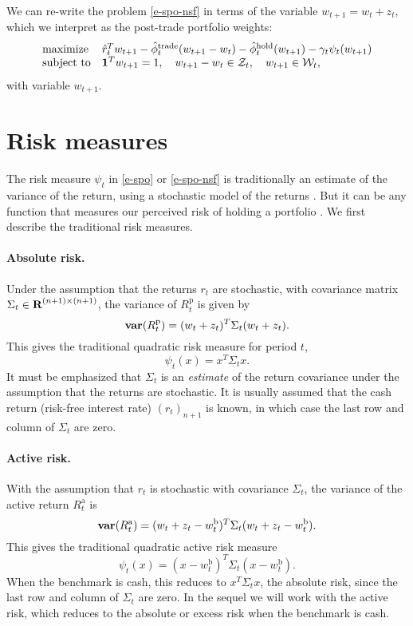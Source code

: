 \documentclass[openany]{article}  %
\newcommand{\trcosthat}{\hat \phi^\mathrm{trade}}
\newcommand{\hldcosthat}{\hat \phi^\mathrm{hold}}
\newcommand{\Rp}{R^\mathrm{p}}
\newcommand{\Rap}{R^\mathrm{a}}
\newcommand{\wb}{w^\mathrm{b}}
\begin{document}
We can re-write the problem \eqref{e-spo-nsf} in terms of
the variable $w_{t+1} = w_t +z_t$, which we interpret as the post-trade
portfolio weights:
\begin{equation}\label{e-spo-wt}
\begin{array}{ll}
\mbox{maximize} &
\hat r_t^T w_{t+1}
- \trcosthat_t (w_{t+1}-w_t) - \hldcosthat_t (w_{t+1})
-\gamma_t \psi_t(w_{t+1})\\
\mbox{subject to} &
\ones^Tw_{t+1} = 1, \quad w_{t+1}-w_t \in \mathcal Z_t, \quad
w_{t+1} \in \mathcal W_t,
\end{array}
\end{equation}
with variable $w_{t+1}$.

\section{Risk measures}
\label{s-risk-measures}
The risk measure $\psi_t$ in \eqref{e-spo} or \eqref{e-spo-nsf}
is traditionally an estimate of the variance of the return,
using a stochastic model of the returns \cite{markowitz1952portfolio, kolm2014years}.
But it can be any function that measures our perceived
risk of holding a portfolio \cite{frittelli2002putting}.
We first describe the traditional risk measures.

\paragraph{Absolute risk.}
Under the assumption that the returns $r_t$ are stochastic, with
covariance matrix $\Sigma_t \in {\mbox{\bf R}}^{(n+1)\times (n+1)}$,
the variance of $\Rp_t$ is given by
\[
\var(\Rp_t) = (w_t + z_t)^T \Sigma_t (w_t +z_t ).
\]
This gives the traditional quadratic risk measure for period $t$,
\[
\psi_t(x) = x^T \Sigma_t x.
\]
It must be emphasized that $\Sigma_t$ is an \emph{estimate} of the
return covariance under the assumption that the returns are stochastic.
It is usually assumed that the cash return (risk-free interest rate)
$(r_t)_{n+1}$ is known, in which case the last row and column of $\Sigma_t$ are zero.

\paragraph{Active risk.}
With the assumption that $r_t$ is stochastic with covariance $\Sigma_t$,
the variance of the active return $\Rap_t$ is
\[
\var(\Rap_t) = (w_t + z_t - \wb_t)^T\Sigma_t(w_t+z_t-\wb_t).
\]
This gives the traditional quadratic active risk measure
\[
\psi_t(x) = (x-\wb_t)^T\Sigma_t(x-\wb_t).
\]
When the benchmark is cash, this reduces to $x^T\Sigma_t x$, the absolute risk,
since the last row and column of $\Sigma_t$ are zero.
In the sequel we will work with the active risk,
which reduces to the absolute or excess risk when the benchmark is cash.
\end{document}
